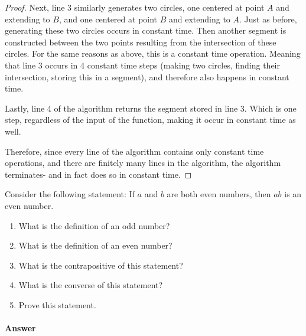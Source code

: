 \documentclass{article}
\begin{document}
\begin{enumerate}
\begin{proof}
			Next, line 3 similarly generates two circles, one centered at point $A$ and extending to $B$, and one
			centered at point $B$ and extending to $A$. Just as before, generating these two circles occurs in constant
			time. Then another segment is constructed between the two points resulting from the intersection of these
			circles. For the same reasons as above, this is a constant time operation. Meaning that line 3 occurs in 4
			constant time steps (making two circles, finding their intersection, storing this in a segment), 
			and therefore also happens in constant time.

			Lastly, line 4 of the algorithm returns the segment stored in line 3. Which is one step, regardless of the input
			of the function, making it occur in constant time as well.

			Therefore, since every line of the algorithm contains only constant time operations, and there are finitely
			many lines in the algorithm, the algorithm terminates- and in fact does so in constant time.

		\end{proof}
\end{enumerate}




\nextprob
Consider the following statement: If $a$ and $b$ are both even numbers, then $ab$ is
an even number.
\begin{enumerate}
    \item What is the definition of an odd number?
    \item What is the definition of an even number?
    \item What is the contrapositive of this statement?
    \item What is the converse of this statement?
    \item Prove this statement.
\end{enumerate}

\paragraph{Answer}
\end{document}
